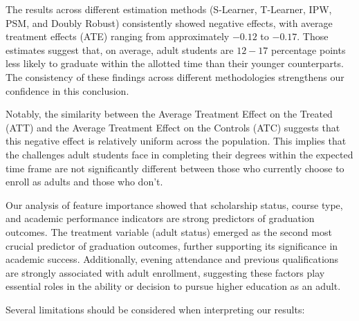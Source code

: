 \documentclass{article}
\begin{document}
The results across different estimation methods (S-Learner, T-Learner, IPW, PSM, and Doubly Robust) consistently showed negative effects, with average treatment effects (ATE) ranging from approximately $-0.12$ to $-0.17$. Those estimates suggest that, on average, adult students are $12-17$ percentage points less likely to graduate within the allotted time than their younger counterparts. The consistency of these findings across different methodologies strengthens our confidence in this conclusion.

Notably, the similarity between the Average Treatment Effect on the Treated (ATT) and the Average Treatment Effect on the Controls (ATC) suggests that this negative effect is relatively uniform across the population. This implies that the challenges adult students face in completing their degrees within the expected time frame are not significantly different between those who currently choose to enroll as adults and those who don't.

Our analysis of feature importance showed that scholarship status, course type, and academic performance indicators are strong predictors of graduation outcomes. The treatment variable (adult status) emerged as the second most crucial predictor of graduation outcomes, further supporting its significance in academic success. Additionally, evening attendance and previous qualifications are strongly associated with adult enrollment, suggesting these factors play essential roles in the ability or decision to pursue higher education as an adult.

Several limitations should be considered when interpreting our results:
\end{document}
